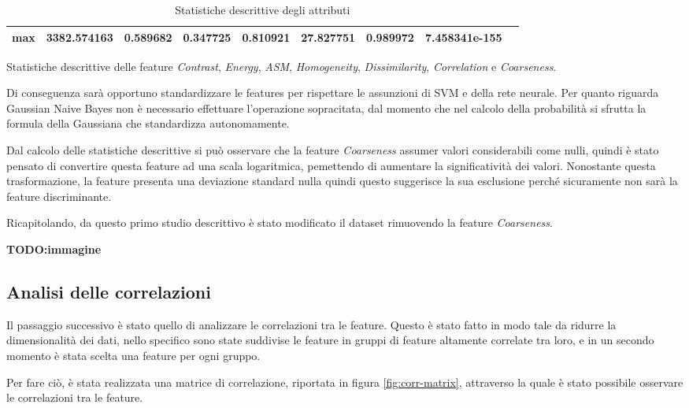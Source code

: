 \begin{table}[h!]
\begin{subtable}[h]{1\textwidth}
{\begin{tabular}{c|c c c c c c c c}
                        \textbf{max}                                              & 3382.574163       & 0.589682        & 0.347725     & 0.810921             & 27.827751              & 0.989972             & 7.458341e-155       \\ \hline
                  \end{tabular}}
            \caption{Statistiche descrittive delle feature \textit{Contrast}, \textit{Energy}, \textit{ASM}, \textit{Homogeneity}, \textit{Dissimilarity}, \textit{Correlation} e \textit{Coarseness}.}
            \label{tab:secondameta}
      \end{subtable}
      \caption{Statistiche descrittive degli attributi}
      \label{tab:desc-stat}
\end{table}

Di conseguenza sarà opportuno standardizzare le features per rispettare le 
assunzioni di SVM e della rete neurale. Per quanto riguarda Gaussian Naive
Bayes non è necessario effettuare l'operazione sopracitata, dal momento che nel calcolo della 
probabilità si sfrutta la formula della Gaussiana che standardizza autonomamente.

Dal calcolo delle statistiche descrittive si può osservare che la feature \textit{Coarseness}
assumer valori considerabili come nulli, quindi è stato pensato di convertire questa feature
ad una scala logaritmica, pemettendo di aumentare la significatività dei valori.
Nonostante questa trasformazione, la feature presenta una deviazione standard nulla 
quindi questo suggerisce la sua esclusione perché sicuramente non sarà la
feature discriminante.


Ricapitolando, da questo primo studio descrittivo è stato modificato il dataset
rimuovendo la feature \textit{Coarseness}.

\textbf{TODO:immagine}

\subsection{Analisi delle correlazioni}
Il passaggio successivo è  stato quello di analizzare le correlazioni tra le feature.
Questo è stato fatto in modo tale da ridurre la dimensionalità dei dati, nello
specifico sono state suddivise le feature in gruppi di feature altamente correlate
tra loro, e in un secondo momento è stata scelta una feature per ogni gruppo.

Per fare ciò, è stata realizzata una matrice di correlazione, riportata in figura
\ref{fig:corr-matrix}, attraverso la quale è stato possibile osservare le correlazioni
tra le feature.

